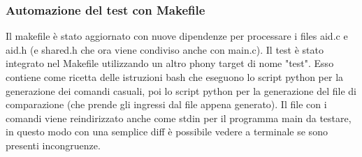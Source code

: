 \documentclass{article}
\begin{document}
	\subsubsection*{Automazione del test con Makefile}		
		Il makefile è stato aggiornato con nuove dipendenze per processare i files aid.c e aid.h (e shared.h che ora
		viene condiviso anche con main.c).
		Il test è stato integrato nel Makefile utilizzando un altro phony target di nome "test". Esso contiene come
		ricetta delle istruzioni bash che eseguono lo script python per la generazione dei comandi casuali, poi lo script
		python per la generazione del file di comparazione (che prende gli ingressi dal file appena generato). Il file con
		i comandi viene reindirizzato anche come stdin per il programma main da testare, in questo modo con una semplice 
		diff è possibile vedere a terminale se sono presenti incongruenze.

\end{document}
